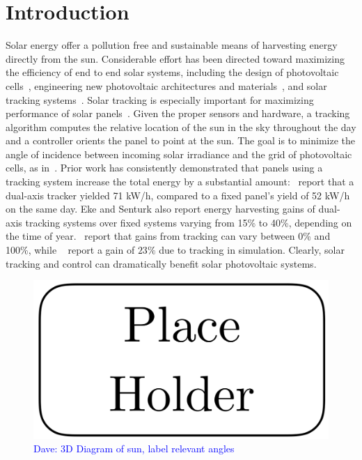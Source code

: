 \documentclass{article}
\newcommand{\dnote}[1]{\textcolor{blue}{Dave: #1}}
\begin{document}
\section{Introduction}
Solar energy offer a pollution free and sustainable means of harvesting energy directly from the sun. Considerable effort has been directed toward maximizing the efficiency of end to end solar systems, including the design of photovoltaic cells~\cite{Jervase2001,li2012molecular}, engineering new photovoltaic architectures and materials~\cite{li2005high}, and solar tracking systems~\cite{camacho2012control}. Solar tracking is especially important for maximizing performance of solar panels~\cite{Eke2012,Rizk2008,King2001}. Given the proper sensors and hardware, a tracking algorithm computes the relative location of the sun in the sky throughout the day and a controller orients the panel to point at the sun. The goal is to minimize the angle of incidence between incoming solar irradiance and the grid of photovoltaic cells, as in~\citet{Eke2012,Benghanem2011,King2001, kalogirou1996design}. Prior work has consistently demonstrated that panels using a tracking system increase the total energy by a substantial amount:~\citet{Eke2012} report that a dual-axis tracker yielded 71 kW/h, compared to a fixed panel's yield of 52 kW/h on the same day. Eke and Senturk also report energy harvesting gains of dual-axis tracking systems over fixed systems varying from 15\% to 40\%, depending on the time of year.~\citet{mousazadeh2009review} report that gains from tracking can vary between 0\% and 100\%, while ~\citet{clifford2004design} report a gain of $23\%$ due to tracking in simulation. Clearly, solar tracking and control can dramatically benefit solar photovoltaic systems.


\begin{figure}[t]
\begin{center}
\includegraphics[scale=0.3]{figures/placeholder.png}
\caption{\dnote{3D Diagram of sun, label relevant angles}}
\end{center}
\end{figure}
\end{document}
